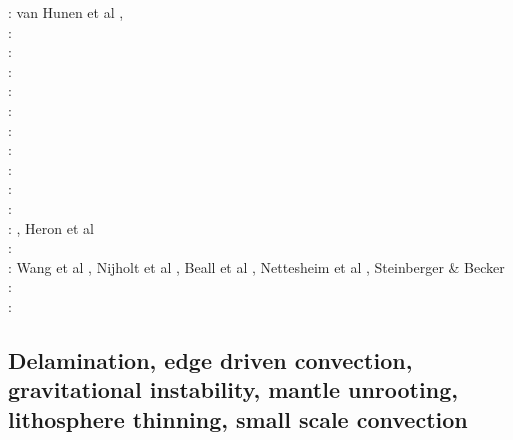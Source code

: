 \begin{scriptsize}
\twothousandfive: van Hunen et al \cite{vazs05}, \cite{hagu05}\cite{wiwg05}\cite{mcjp05}\\
\twothousandsix: \cite{bube06}\cite{basv06}\cite{kasc06}\cite{fuwb06}\cite{colm06}\cite{pabs06}\cite{crnp06} \cite{sahm06}\\
\twothousandseven: \cite{afrf07}\cite{kore07}\cite{gewm07}\cite{jabn07}\\
\twothousandeight: \cite{affr08}\cite{tibb08}\cite{hapo08}\cite{busc08}\cite{clbz08}\cite{chlg08}
      \cite{kasb08}\cite{fabs08}\cite{chgu08}\cite{buit08}\cite{onlg08}\\
\twothousandnine: \cite{bupb09}\cite{plmg09}\cite{rigo09}\cite{bubg09}\cite{coco09}\\
\twothousandten: \cite{hamo10}\cite{fasm10}\cite{grpy10}\cite{vago10}\cite{plmf10}\cite{spgs10a}\cite{pygp10}
      \cite{jabw10}\\
\twothousandeleven: \cite{rera11}\cite{chss11}\\
\twothousandtwelve: \cite{wagw12}\cite{vacl12}\cite{buit12}\cite{kogp12}\cite{gohg12}\cite{trub12}\\
\twothousandthirteen: \cite{wazh13}\cite{krcu13}\cite{frbm13}\cite{wagw13}\cite{duyp13}\cite{rugb13} \cite{scdg13}\\
\twothousandfourteen: \cite{kava14}\cite{dusp14}\cite{wavp14}\cite{whbb14}\cite{scml14}
      \cite{mals14}\cite{gupm14}\cite{gahs14}\cite{mutg14}\\
\twothousandfifteen: \cite{wavp15}\cite{thkp15}\cite{mags15}\cite{duys15}\cite{dusp15}\\
\twothousandsixteen: \cite{wahz16}, Heron et al \cite{heps16}\\
\twothousandseventeen: \cite{rugb17}\cite{ozgw17}\cite{vomc17}\cite{taac17}\cite{ithc17}\\
\twothousandeighteen: Wang et al \cite{wavp18}, Nijholt et al \cite{nigw18}, Beall et al \cite{bemc18}, Nettesheim et al \cite{neew18}, Steinberger \& Becker \cite{stbe18}\\
\twothousandnineteen: \cite{koen19}\cite{kipd19}\cite{crcm19}\cite{pedm19}\cite{mazz19}\cite{chch19}\\
\twothousandtwenty: \cite{yamq20}
\end{scriptsize}


\subsection{Delamination, edge driven convection, gravitational instability, mantle unrooting, lithosphere thinning, small scale convection} 

